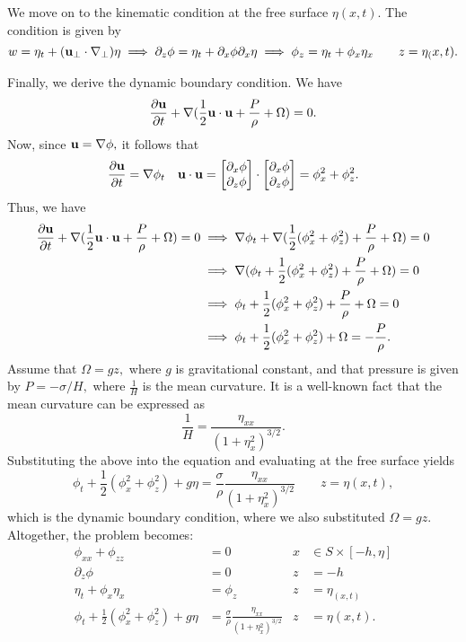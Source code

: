 \documentclass[10pt,reqno,oneside,a4paper]{article}
\begin{document}
We move on to the kinematic condition at the free surface $\eta(x,t).$ The condition is given by 
\begin{equation}\label{EE-kinematic}
w = \eta_t + ({\bf u}_{\perp} \cdot \nabla_{\perp})\eta \implies \partial_z \phi = \eta_t + \partial_x \phi \partial_x \eta \implies \phi_z = \eta_t + \phi_x \eta_x \qquad z = \eta_(x,t).
\end{equation}


Finally, we derive the dynamic boundary condition. We have
\[ \frac{\partial {\bf u}}{\partial t} + \nabla (\frac{1}{2} {\bf u} \cdot {\bf u} + \frac{P}{\rho} + \Omega) = 0. \]
Now, since ${\bf u} = \nabla \phi,$ it follows that 
\[ 
\frac{\partial {\bf u}}{\partial t} = \nabla \phi_t \quad {\bf u} \cdot {\bf u} = \begin{bmatrix} \partial_x \phi \\ \partial_z \phi \end{bmatrix} \cdot \begin{bmatrix} \partial_x \phi \\ \partial_z \phi \end{bmatrix} = \phi_x^2 + \phi_z^2.
\]
Thus, we have 
\begin{align*}
\frac{\partial {\bf u}}{\partial t} + \nabla (\frac{1}{2} {\bf u} \cdot {\bf u} + \frac{P}{\rho} + \Omega) = 0 &\implies \nabla \phi_t  + \nabla (\frac{1}{2} (\phi_x^2 + \phi_z^2) + \frac{P}{\rho} + \Omega) = 0 \\
&\implies \nabla(\phi_t + \frac{1}{2} (\phi_x^2 + \phi_z^2) + \frac{P}{\rho} + \Omega) = 0 \\
&\implies \phi_t + \frac{1}{2} (\phi_x^2 + \phi_z^2) + \frac{P}{\rho} + \Omega = 0 \\
&\implies \phi_t + \frac{1}{2} (\phi_x^2 + \phi_z^2) + \Omega = -  \frac{P}{\rho}.
\end{align*}
Assume that $\Omega = g z,$ where $g$ is gravitational constant, and that pressure is given by $P = -\sigma/H,$ where $\frac{1}{H}$ is the mean curvature. It is a well-known fact that the mean curvature can be expressed as 
\[ 
\frac{1}{H} = \frac{\eta_{xx}}{(1+\eta_x^2)^{3/2}}.
\]
Substituting the above into the equation and evaluating at the free surface yields 
\begin{equation}\label{EE-dynamic}
\phi_t + \frac{1}{2} (\phi_x^2 + \phi_z^2) + g\eta = \frac{\sigma}{\rho} \frac{\eta_{xx}}{(1+\eta_x^2)^{3/2}} \qquad z = \eta(x, t),
\end{equation} 
which is the dynamic boundary condition, where we also substituted $\Omega = gz$. Altogether, the problem becomes:
\begin{align*}
\phi_{xx} + \phi_{zz} &= 0 &x &\in S\times [-h, \eta] \\
\partial_z \phi &= 0 &z &= -h \\
\eta_t + \phi_x \eta_x &= \phi_z &z &= \eta_(x,t) \\
\phi_t + \frac{1}{2} (\phi_x^2 + \phi_z^2) + g\eta &= \frac{\sigma}{\rho} \frac{\eta_{xx}}{(1+\eta_x^2)^{3/2}} &z &= \eta(x, t).
\end{align*}
\end{document}
